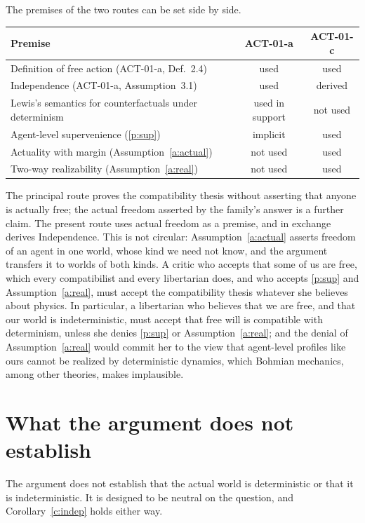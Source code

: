 \documentclass{situationist-preprint}
\begin{document}
The premises of the two routes can be set side by side.

\begin{center}\small
\begin{tabular}{@{}p{}cc@{}}
\toprule
Premise & ACT-01-a & ACT-01-c \\
\midrule
Definition of free action (ACT-01-a, Def.~2.4) & used & used \\
Independence (ACT-01-a, Assumption~3.1) & used & derived \\
Lewis's semantics for counterfactuals under determinism & used in support & not used \\
Agent-level supervenience (\ref{p:sup}) & implicit & used \\
Actuality with margin (Assumption~\ref{a:actual}) & not used & used \\
Two-way realizability (Assumption~\ref{a:real}) & not used & used \\
\bottomrule
\end{tabular}
\end{center}

The principal route proves the compatibility thesis without asserting that anyone is actually free; the actual freedom asserted by the family's answer is a further claim. The present route uses actual freedom as a premise, and in exchange derives Independence. This is not circular: Assumption~\ref{a:actual} asserts freedom of an agent in one world, whose kind we need not know, and the argument transfers it to worlds of both kinds. A critic who accepts that some of us are free, which every compatibilist and every libertarian does, and who accepts \ref{p:sup} and Assumption~\ref{a:real}, must accept the compatibility thesis whatever she believes about physics. In particular, a libertarian who believes that we are free, and that our world is indeterministic, must accept that free will is compatible with determinism, unless she denies \ref{p:sup} or Assumption~\ref{a:real}; and the denial of Assumption~\ref{a:real} would commit her to the view that agent-level profiles like ours cannot be realized by deterministic dynamics, which Bohmian mechanics, among other theories, makes implausible.

\section{What the argument does not establish}\label{s:not}

The argument does not establish that the actual world is deterministic or that it is indeterministic. It is designed to be neutral on the question, and Corollary~\ref{c:indep} holds either way.
\end{document}
